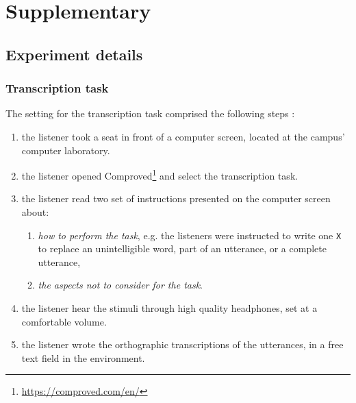 \section{Supplementary}

\subsection{Experiment details}
%
\subsubsection{Transcription task} \label{appA:transcription}
%
The setting for the transcription task comprised the following steps \citep{Boonen_et_al_2020, Boonen_et_al_2021}:
%
\begin{enumerate} %
	\item the listener took a seat in front of a computer screen, located at the campus' computer laboratory.
	\item the listener opened Comproved\footnote{\url{https://comproved.com/en/}} and select the transcription task.
	\item the listener read two set of instructions presented on the computer screen about:
	\begin{enumerate}
		\item \textit{how to perform the task}, e.g. the listeners were instructed to write one \texttt{X} to replace an unintelligible word, part of an utterance, or a complete utterance,
		\item \textit{the aspects not to consider for the task}.
	\end{enumerate}
	\item the listener hear the stimuli through high quality headphones, set at a comfortable volume.
	\item the listener wrote the orthographic transcriptions of the utterances, in a free text field in the environment. 
\end{enumerate}
%
%
